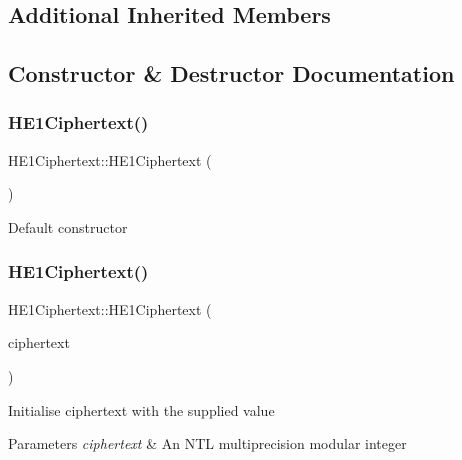\subsection*{Additional Inherited Members}


\subsection{Constructor \& Destructor Documentation}
\mbox{\label{classHE1Ciphertext_afd58548a4f93ef8576f35677fa42e35c}} 
\subsubsection{\texorpdfstring{H\+E1\+Ciphertext()}{HE1Ciphertext()}\hspace{0.1cm}{\footnotesize\ttfamily [1/4]}}
{\footnotesize\ttfamily H\+E1\+Ciphertext\+::\+H\+E1\+Ciphertext (\begin{DoxyParamCaption}{ }\end{DoxyParamCaption})}

Default constructor \mbox{\label{classHE1Ciphertext_a4956d0c93fecd2db56a51e77f6f959ef}} 
\subsubsection{\texorpdfstring{H\+E1\+Ciphertext()}{HE1Ciphertext()}\hspace{0.1cm}{\footnotesize\ttfamily [2/4]}}
{\footnotesize\ttfamily H\+E1\+Ciphertext\+::\+H\+E1\+Ciphertext (\begin{DoxyParamCaption}\item[{N\+T\+L\+::\+Z\+Z\+\_\+p \&}]{ciphertext }\end{DoxyParamCaption})}

Initialise {\ttfamily ciphertext} with the supplied value 
\begin{DoxyParams}{Parameters}
{\em ciphertext} & An N\+TL multiprecision modular integer \\
\hline
\end{DoxyParams}
\mbox{\label{classHE1Ciphertext_a178b26d8b0a54d3e1e0e5bb04bb09bd6}} 
